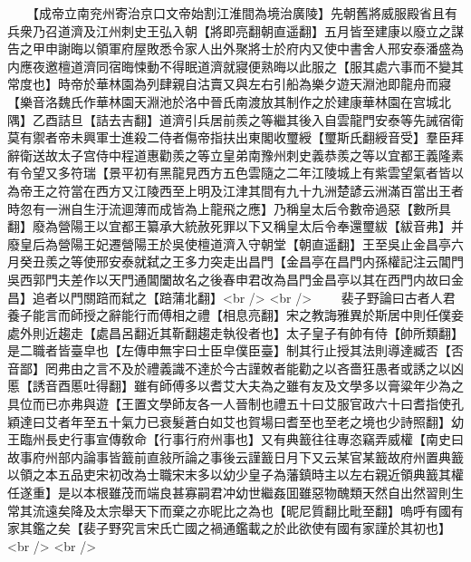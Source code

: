 　　【成帝立南兖州寄治京口文帝始割江淮間為境治廣陵】先朝舊將威服殿省且有兵衆乃召道濟及江州刺史王弘入朝【將即亮翻朝直遥翻】五月皆至建康以廢立之謀告之甲申謝晦以領軍府屋敗悉令家人出外聚將士於府内又使中書舍人邢安泰潘盛為内應夜邀檀道濟同宿晦悚動不得眠道濟就寢便熟晦以此服之【服其處六事而不變其常度也】時帝於華林園為列肆親自沽賣又與左右引船為樂夕遊天淵池即龍舟而寢【樂音洛魏氏作華林園天淵池於洛中晉氏南渡放其制作之於建康華林園在宫城北隅】乙酉詰旦【詰去吉翻】道濟引兵居前羨之等繼其後入自雲龍門安泰等先誡宿衛莫有禦者帝未興軍士進殺二侍者傷帝指扶出東閣收璽綬【璽斯氏翻綬音受】羣臣拜辭衛送故太子宫侍中程道惠勸羨之等立皇弟南豫州刺史義恭羨之等以宜都王義隆素有令望又多符瑞【景平初有黑龍見西方五色雲隨之二年江陵城上有紫雲望氣者皆以為帝王之符當在西方又江陵西至上明及江津其間有九十九洲楚諺云洲滿百當出王者時忽有一洲自生汙流逥薄而成皆為上龍飛之應】乃稱皇太后令數帝過惡【數所具翻】廢為營陽王以宜都王纂承大統赦死罪以下又稱皇太后令奉還璽紱【紱音弗】并廢皇后為營陽王妃遷營陽王於吳使檀道濟入守朝堂【朝直遥翻】王至吳止金昌亭六月癸丑羨之等使邢安泰就弑之王多力突走出昌門【金昌亭在昌門内孫權記注云閶門吳西郭門夫差作以天門通閶闔故名之後春申君改為昌門金昌亭以其在西門内故曰金昌】追者以門關踣而弑之【踣蒲北翻】<br />
<br />
　　裴子野論曰古者人君養子能言而師授之辭能行而傅相之禮【相息亮翻】宋之教誨雅異於斯居中則任僕妾處外則近趨走【處昌呂翻近其靳翻趨走執役者也】太子皇子有帥有侍【帥所類翻】是二職者皆臺皁也【左傳申無宇曰士臣皁僕臣臺】制其行止授其法則導達臧否【否音鄙】罔弗由之言不及於禮義識不達於今古謹敇者能勸之以吝嗇狂愚者或誘之以凶慝【誘音酉慝吐得翻】雖有師傅多以耆艾大夫為之雖有友及文學多以膏粱年少為之具位而已亦弗與遊【王置文學師友各一人晉制也禮五十曰艾服官政六十曰耆指使孔穎達曰艾者年至五十氣力已衰髮蒼白如艾也賀場曰耆至也至老之境也少詩照翻】幼王臨州長史行事宣傳敎命【行事行府州事也】又有典籖往往專恣竊弄威權【南史曰故事府州部内論事皆籖前直敍所論之事後云謹籖日月下又云某官某籖故府州置典籖以領之本五品吏宋初改為士職宋末多以幼少皇子為藩鎮時主以左右親近領典籖其權任遂重】是以本根雖茂而端良甚寡嗣君冲幼世繼姦囬雖惡物醜類天然自出然習則生常其流遠矣降及太宗舉天下而棄之亦昵比之為也【昵尼質翻比毗至翻】嗚呼有國有家其鑑之矣【裴子野究言宋氏亡國之禍通鑑載之於此欲使有國有家謹於其初也】<br />
<br />
